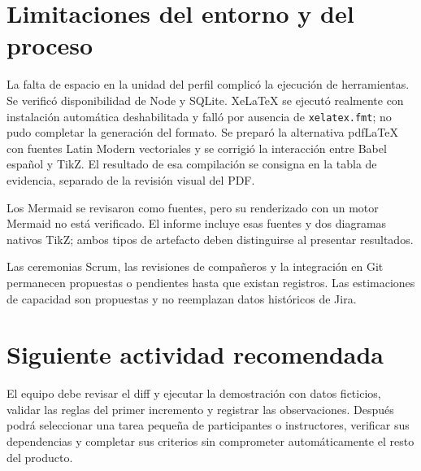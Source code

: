 \section{Limitaciones del entorno y del proceso}
La falta de espacio en la unidad del perfil complicó la ejecución de herramientas. Se verificó disponibilidad de Node y SQLite. XeLaTeX se ejecutó realmente con instalación automática deshabilitada y falló por ausencia de \texttt{xelatex.fmt}; no pudo completar la generación del formato. Se preparó la alternativa pdfLaTeX con fuentes Latin Modern vectoriales y se corrigió la interacción entre Babel español y TikZ. El resultado de esa compilación se consigna en la tabla de evidencia, separado de la revisión visual del PDF.

Los Mermaid se revisaron como fuentes, pero su renderizado con un motor Mermaid no está verificado. El informe incluye esas fuentes y dos diagramas nativos TikZ; ambos tipos de artefacto deben distinguirse al presentar resultados.

Las ceremonias Scrum, las revisiones de compañeros y la integración en Git permanecen propuestas o pendientes hasta que existan registros. Las estimaciones de capacidad son propuestas y no reemplazan datos históricos de Jira.

\section{Siguiente actividad recomendada}
El equipo debe revisar el diff y ejecutar la demostración con datos ficticios, validar las reglas del primer incremento y registrar las observaciones. Después podrá seleccionar una tarea pequeña de participantes o instructores, verificar sus dependencias y completar sus criterios sin comprometer automáticamente el resto del producto.
